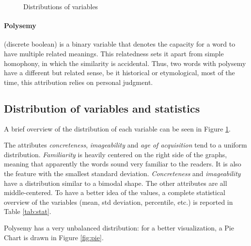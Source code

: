 \documentclass[a4paper,11pt,dvipsnames]{article}
\begin{document}
\begin{figure}[ht]
\caption{Distributions of variables}\label{fig:dis}

\end{figure}

\paragraph{Polysemy} (discrete boolean) is a binary variable that denotes the capacity for a word to have multiple related meanings. This relatedness sets it apart from simple homophony, in which the similarity is accidental. Thus, two words with polysemy have a different but related sense, be it historical or etymological, most of the time, this attribution relies on personal judgment.



\subsection[Distributions and statistics]{Distribution of variables and statistics}


A brief overview of the distribution of each variable can be seen in Figure \ref{fig:dis}. 



The attributes \textit{concreteness}, \textit{imageability} and \textit{age of acquisition} tend to a uniform distribution. \textit{Familiarity} is heavily centered on the right side of the graphs, meaning that apparently the words sound very familiar to the readers. It is also the feature with the smallest standard deviation. \textit{Concreteness} and \textit{imageability} have a distribution similar to a bimodal shape. The other attributes are all middle-centered. To have a better idea of the values, a complete statistical overview of the variables (mean, std deviation, percentile, etc.) is reported in Table \ref{tab:stat}. 

Polysemy has a very unbalanced distribution: for a better visualization, a Pie Chart is drawn in Figure \ref{fig:pie}.
\end{document}
